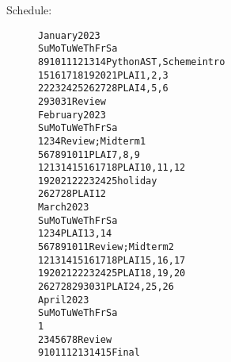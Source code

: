 \documentclass{article}
\newcommand{\myitem}[1]{\item[#1]}
\begin{document}
\begin{description}
\newpage
\myitem{Schedule:}
\begin{alltt} \large
    January 2023
Su Mo Tu We Th Fr Sa
 8  9 10 11 12 13 14  Python AST, Scheme intro
15 {\color{red}16} 17 18 19 20 21  PLAI 1,2,3
22 23 24 25 26 27 28  PLAI 4,5,6
29 30 31              Review
    February 2023
Su Mo Tu We Th Fr Sa
          1  2  3  4  Review; Midterm 1
 5  6  7  8  9 10 11  PLAI 7,8,9
12 13 14 15 16 17 18  PLAI 10,11,12
19 {\color{red}20 21 22 23 24} 25  holiday
26 27 28              PLAI 12
     March 2023
Su Mo Tu We Th Fr Sa
          1  2  3  4  PLAI 13,14 
 5  6  7  8  9 10 11  Review; Midterm 2
12 13 14 15 16 17 18  PLAI 15,16,17
19 20 21 22 23 24 25  PLAI 18,19,20
26 27 28 29 30 31     PLAI 24,25,26
     April 2023
Su Mo Tu We Th Fr Sa
                   1
 2  3  4  5  6  7  8  Review
 9 {\color{red}10 11 12 13 14} 15  Final
\end{alltt}


\end{description}
\end{document}
